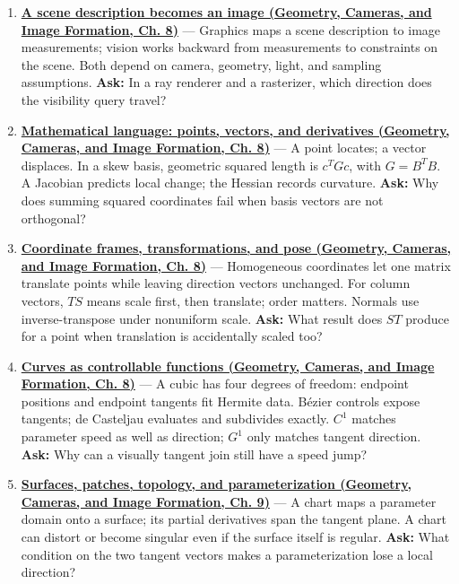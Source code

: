 \begin{enumerate}
\def\labelenumi{\arabic{enumi}.}
\item
  \textbf{\href{../03-Geometry-Cameras-and-Image-Formation/main.pdf\#nameddest=03-visual-computing-i-ch001-a-scene-description-becomes-an-image}{A scene description becomes an image (Geometry, Cameras, and Image Formation, Ch. 8)}} --- Graphics maps a scene description to image measurements; vision works backward from measurements to constraints on the scene. Both depend on camera, geometry, light, and sampling assumptions. \textbf{Ask:} In a ray renderer and a rasterizer, which direction does the visibility query travel?
\item
  \textbf{\href{../03-Geometry-Cameras-and-Image-Formation/main.pdf\#nameddest=03-visual-computing-i-ch001-mathematical-language-points-vectors-and-derivatives}{Mathematical language: points, vectors, and derivatives (Geometry, Cameras, and Image Formation, Ch. 8)}} --- A point locates; a vector displaces. In a skew basis, geometric squared length is \(c^T Gc\), with \(G=B^TB\). A Jacobian predicts local change; the Hessian records curvature. \textbf{Ask:} Why does summing squared coordinates fail when basis vectors are not orthogonal?
\item
  \textbf{\href{../03-Geometry-Cameras-and-Image-Formation/main.pdf\#nameddest=03-visual-computing-i-ch001-coordinate-frames-transformations-and-pose}{Coordinate frames, transformations, and pose (Geometry, Cameras, and Image Formation, Ch. 8)}} --- Homogeneous coordinates let one matrix translate points while leaving direction vectors unchanged. For column vectors, \(TS\) means scale first, then translate; order matters. Normals use inverse-transpose under nonuniform scale. \textbf{Ask:} What result does \(ST\) produce for a point when translation is accidentally scaled too?
\item
  \textbf{\href{../03-Geometry-Cameras-and-Image-Formation/main.pdf\#nameddest=03-visual-computing-i-ch001-curves-as-controllable-functions}{Curves as controllable functions (Geometry, Cameras, and Image Formation, Ch. 8)}} --- A cubic has four degrees of freedom: endpoint positions and endpoint tangents fit Hermite data. Bézier controls expose tangents; de Casteljau evaluates and subdivides exactly. \(C^1\) matches parameter speed as well as direction; \(G^1\) only matches tangent direction. \textbf{Ask:} Why can a visually tangent join still have a speed jump?
\item
  \textbf{\href{../03-Geometry-Cameras-and-Image-Formation/main.pdf\#nameddest=03-visual-computing-i-ch002-surfaces-patches-topology-and-parameterization}{Surfaces, patches, topology, and parameterization (Geometry, Cameras, and Image Formation, Ch. 9)}} --- A chart maps a parameter domain onto a surface; its partial derivatives span the tangent plane. A chart can distort or become singular even if the surface itself is regular. \textbf{Ask:} What condition on the two tangent vectors makes a parameterization lose a local direction?

\end{enumerate}

